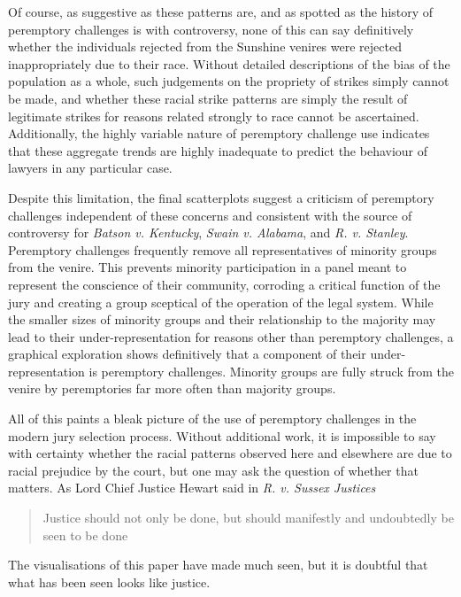 Of course, as suggestive as these patterns are, and as spotted as the history of peremptory challenges is with controversy, none
of this can say definitively whether the individuals rejected from the
Sunshine venires were rejected inappropriately due to their race. Without detailed descriptions of the bias of the population as a whole, such judgements on the propriety of strikes simply
cannot be made, and whether these racial strike patterns are simply the result of legitimate strikes for reasons related
strongly to race cannot be ascertained. Additionally, the highly
variable nature of peremptory challenge use indicates that these
aggregate trends are highly inadequate to predict the behaviour of
lawyers in any particular case.

Despite this limitation, the final scatterplots suggest a criticism of
peremptory challenges independent of these concerns and consistent with the source
of controversy for \textit{Batson v. Kentucky}, \textit{Swain v. Alabama}, and \textit{R. v. Stanley}. Peremptory challenges
frequently remove all representatives of minority groups from the
venire. This prevents minority participation in a panel meant to
represent the conscience of their community, corroding a critical function of the jury and creating a group
sceptical of the operation of the legal system. While the smaller sizes of minority groups and their relationship to the
majority may lead to their under-representation for reasons other than peremptory challenges, a graphical exploration shows
definitively that a component of their under-representation is
peremptory challenges. Minority groups are fully struck from the
venire by peremptories far more often than majority groups.

All of this paints a bleak picture of the use of peremptory challenges in the modern jury selection process. Without additional
work, it is impossible to say with certainty whether the racial patterns observed here and elsewhere are due to racial prejudice
by the court, but one may ask the question of whether that matters. As Lord Chief Justice Hewart said in \textit{R. v. Sussex
  Justices}

\begin{quote}
  Justice should not only be done, but should manifestly and undoubtedly be seen to be done
\end{quote}

The visualisations of this paper have made much seen, but it is doubtful that what has been seen looks like justice.

